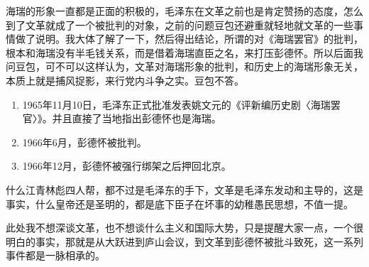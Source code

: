 \documentclass[12pt,oneside]{book}
\begin{document}
海瑞的形象一直都是正面的积极的，毛泽东在文革之前也是肯定赞扬的态度，怎么到了文革就成了一个被批判的对象，之前的问题豆包还避重就轻地就文革的一些事情做了说明。我大体了解了一下，然后得出结论，所谓的对《海瑞罢官》的批判，根本和海瑞没有半毛钱关系，而是借着海瑞直臣之名，来打压彭德怀。所以后面我问豆包，可不可以这样认为，文革对海瑞形象的批判，和历史上的海瑞形象无关，本质上就是捕风捉影，来行党内斗争之实。豆包不答。

\begin{enumerate}
\item 1965年11月10日，毛泽东正式批准发表姚文元的《评新编历史剧〈海瑞罢官〉》。并且直接了当地指出彭德怀也是海瑞。
\item 1966年6月，彭德怀被批判。
\item 1966年12月，彭德怀被强行绑架之后押回北京。
\end{enumerate}

什么江青林彪四人帮，都不过是毛泽东的手下，文革是毛泽东发动和主导的，这是事实，什么皇帝还是圣明的，都是底下臣子在坏事的幼稚愚民思想，不值一提。

此处我不想深谈文革，也不想谈什么主义和国际大势，只是提醒大家一点，一个很明白的事实，那就是从大跃进到庐山会议，到文革到彭德怀被批斗致死，这一系列事件都是一脉相承的。
\end{document}
